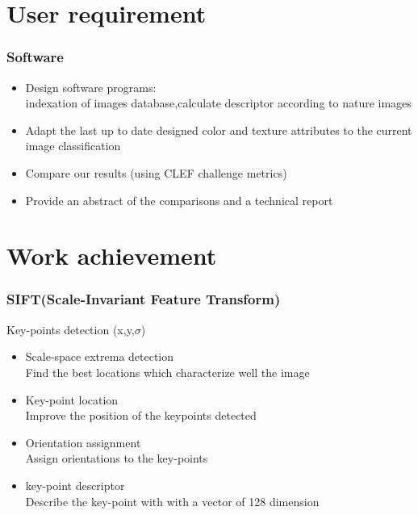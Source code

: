 \documentclass[xcolor=table]{beamer}
\begin{document}
\section{User requirement}
\begin{frame} \frametitle{Software}
\begin{itemize}
 \item Design  software programs:\\
   indexation of  images database,calculate descriptor according to  nature images
\item Adapt the last up to date designed color and texture attributes to the current image classification
\item Compare our results (using CLEF challenge metrics)
\item Provide an abstract of the comparisons and a technical report
\end{itemize}






\end{frame}

\section{Work achievement}
\begin{frame} \frametitle{SIFT(Scale-Invariant Feature Transform)}

Key-points detection (x,y,$\sigma$)
\begin{itemize}

\item Scale-space extrema detection\\
Find the best locations which characterize well the image

 \item  Key-point location\\
 Improve the position of the keypoints detected

\item Orientation assignment\\
 Assign orientations to the key-points

\item key-point descriptor \\
Describe the key-point with with a vector of 128 dimension
\end{itemize}
\end{frame}
\end{document}
